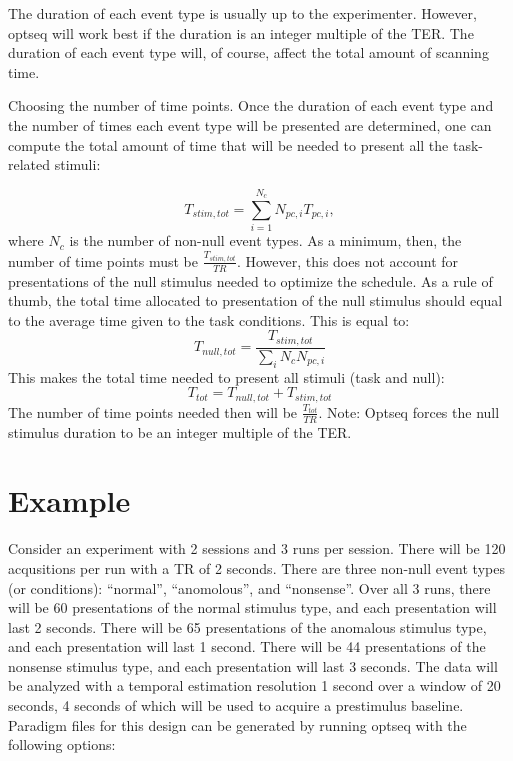 \documentclass[10pt]{article}
\begin{document}
The duration of each event type is usually up to the
experimenter. However, optseq will work best if the duration is an
integer multiple of the TER. The duration of each event type will, of
course, affect the total amount of scanning time.

Choosing the number of time points.  Once the duration of each event
type and the number of times each event type will be presented are
determined, one can compute the total amount of time that will be
needed to present all the task-related stimuli:

\begin{equation}
T_{stim,tot} = \sum_{i=1}^{N_c} N_{pc,i}T_{pc,i},
\end{equation}
where $N_c$ is the number of non-null event types. As a minimum, then,
the number of time points must be $\frac{T_{stim,tot}}{TR}$. However,
this does not account for presentations of the null stimulus needed to
optimize the schedule. As a rule of thumb, the total time
allocated to presentation of the null stimulus should equal to the
average time given to the task conditions. This is equal to:
\begin{equation}
T_{null,tot} = \frac { T_{stim,tot} }
                     { \sum_{i}{N_c}N_{pc,i} }
\end{equation}
This makes the total time needed to present all stimuli (task and
null):
\begin{equation}
T_{tot} = T_{null,tot} +  T_{stim,tot} 
\end{equation}
The number of time points needed then will be $\frac{T_{tot}}{TR}$.
Note: Optseq forces the null stimulus duration to be an integer
multiple of the TER.


\section{Example}

Consider an experiment with 2 sessions and 3 runs per session.  There
will be 120 acqusitions per run with a TR of 2 seconds.  There are
three non-null event types (or conditions): ``normal'', ``anomolous'',
and ``nonsense''.  Over all 3 runs, there will be 60 presentations of
the normal stimulus type, and each presentation will last 2 seconds.
There will be 65 presentations of the anomalous stimulus type, and
each presentation will last 1 second.  There will be 44 presentations
of the nonsense stimulus type, and each presentation will last 3
seconds.  The data will be analyzed with a temporal estimation
resolution 1 second over a window of 20 seconds, 4 seconds of which
will be used to acquire a prestimulus baseline.  Paradigm files for
this design can be generated by running optseq with the following options:
\end{document}
